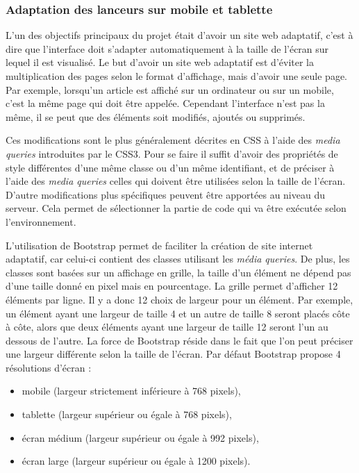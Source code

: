 \documentclass[12pt,a4paper]{article}
\begin{document}
\subsubsection{Adaptation des lanceurs sur mobile et tablette}
L'un des objectifs principaux du projet était d'avoir un site web adaptatif, c'est à dire que l'interface doit s'adapter automatiquement à la taille de l'écran sur lequel il est visualisé. Le but d'avoir un site web adaptatif est d'éviter la multiplication des pages selon le format d'affichage, mais d'avoir une seule page. Par exemple, lorsqu'un article est affiché sur un ordinateur ou sur un mobile, c'est la même page qui doit être appelée. Cependant l'interface n'est pas la même, il se peut que des éléments soit modifiés, ajoutés ou supprimés.\par 
Ces modifications sont le plus généralement décrites en CSS à l'aide des \textit{media queries} introduites par le CSS3. Pour se faire il suffit d'avoir des propriétés de style différentes d'une même classe ou d'un même identifiant, et de préciser à l'aide des \textit{media queries} celles qui doivent être utilisées selon la taille de l'écran. D'autre modifications plus spécifiques peuvent être apportées au niveau du serveur. Cela permet de sélectionner la partie de code qui va être exécutée selon l'environnement.\par
\medskip
L'utilisation de Bootstrap permet de faciliter la création de site internet adaptatif, car celui-ci contient des classes utilisant les \textit{média queries}. De plus, les classes sont basées sur un affichage en grille, la taille d'un élément ne dépend pas d'une taille donné en pixel mais en pourcentage. La grille permet d'afficher 12 éléments par ligne. Il y a donc 12 choix de largeur pour un élément. Par exemple, un élément ayant une largeur de taille 4 et un autre de taille 8 seront placés côte à côte, alors que deux éléments ayant une largeur de taille 12 seront l'un au dessous de l'autre. La force de Bootstrap réside dans le fait que l'on peut préciser une largeur différente selon la taille de l'écran. Par défaut Bootstrap propose 4 résolutions d'écran :
\begin{itemize}
\item mobile (largeur strictement inférieure à 768 pixels),
\item tablette (largeur supérieur ou égale à 768 pixels),
\item écran médium (largeur supérieur ou égale à 992 pixels),
\item écran large (largeur supérieur ou égale à 1200 pixels).
\end{itemize}
\end{document}
